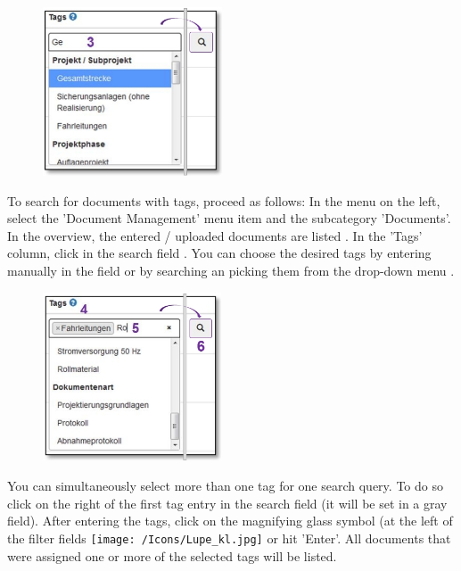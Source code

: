 \pagebreak

\begin{figure}
\vspace{-10pt}
\includegraphics[height=50mm]{../chapters/11_Dokumentenablage/pictures/11-2-8_DokTagHinzufuegen.jpg}
\end{figure}
To search for documents with tags, proceed as follows:
In the menu on the left, select the 'Document Management' menu item and the subcategory 'Documents'. In the overview, the entered / uploaded documents are listed . In the 'Tags' column, click in the search field . You can choose the desired tags by entering manually in the field or by searching an picking them from the drop-down menu .

\vspace{\baselineskip}

\begin{figure}
\vspace{-30pt}
\includegraphics[height=50mm]{../chapters/11_Dokumentenablage/pictures/11-2-8_TagEingabe.jpg}
\end{figure}
You can simultaneously select more than one tag for one search query. To do so click on the right of the first tag entry  in the search field  (it will be set in a gray field). After entering the tags, click on the magnifying glass symbol (at the left of the filter fields \texttt{[image: /Icons/Lupe\_kl.jpg]}  or hit 'Enter'. All documents that were assigned one or more of the selected tags will be listed.

